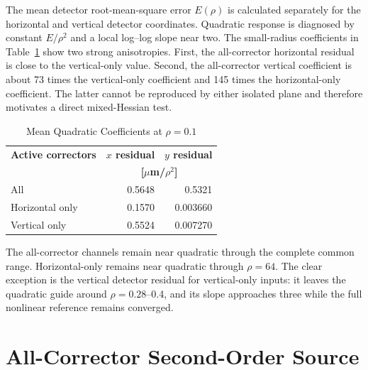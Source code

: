 \documentclass[letterpaper]{jacow}
\begin{document}
The mean detector root-mean-square error $E(\rho)$ is calculated separately
for the horizontal and vertical detector coordinates.  Quadratic response is
diagnosed by constant $E/\rho^2$ and a local log--log slope near two.  The
small-radius coefficients in Table~\ref{tab:quadratic} show two strong
anisotropies.  First, the all-corrector horizontal residual is close to the
vertical-only value.  Second, the all-corrector vertical coefficient is about
73 times the vertical-only coefficient and 145 times the horizontal-only
coefficient.  The latter cannot be reproduced by either isolated plane and
therefore motivates a direct mixed-Hessian test.

\begin{table}[!htb]
  \centering
  \caption{Mean Quadratic Coefficients at $\rho=0.1$}
  \begin{tabular}{lrr}
    \toprule
    \textbf{Active correctors} & \textbf{$x$ residual} & \textbf{$y$ residual} \\
    & \multicolumn{2}{c}{\textbf{[$\mu$m/$\rho^2$]}} \\
    \midrule
    All              & 0.5648 & 0.5321 \\
    Horizontal only  & 0.1570 & 0.003660 \\
    Vertical only    & 0.5524 & 0.007270 \\
    \bottomrule
  \end{tabular}
  \label{tab:quadratic}
\end{table}

The all-corrector channels remain near quadratic through the complete common
range.  Horizontal-only remains near quadratic through $\rho=64$.  The clear
exception is the vertical detector residual for vertical-only inputs: it
leaves the quadratic guide around $\rho=0.28$--0.4, and its slope approaches
three while the full nonlinear reference remains converged.

\section{All-Corrector Second-Order Source}
\end{document}
